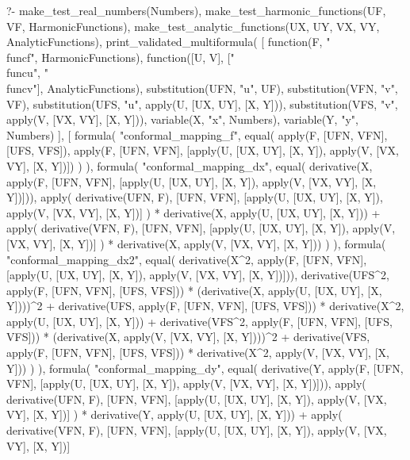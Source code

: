 \begin{prolog}
?-	make_test_real_numbers(Numbers),
	make_test_harmonic_functions(UF, VF, HarmonicFunctions),
	make_test_analytic_functions(UX, UY, VX, VY, AnalyticFunctions),
	print_validated_multiformula(
		[
			function(F, "\\func{f}", HarmonicFunctions),
			function([U, V], ["\\func{u}", "\\func{v}"], AnalyticFunctions),
			substitution(UFN, "u", UF),   %
			substitution(VFN, "v", VF),   %
			substitution(UFS, "u", apply(U, [UX, UY], [X, Y])),   %
			substitution(VFS, "v", apply(V, [VX, VY], [X, Y])),   %
			variable(X, "x", Numbers),
			variable(Y, "y", Numbers)
		],
		[
			formula(
				"conformal_mapping_f",
				equal(
					apply(F, [UFN, VFN], [UFS, VFS]),
					apply(F, [UFN, VFN], [apply(U, [UX, UY], [X, Y]), apply(V, [VX, VY], [X, Y])])
				)
			),
			formula(
				"conformal_mapping_dx",
				equal(
					derivative(X, apply(F, [UFN, VFN], [apply(U, [UX, UY], [X, Y]), apply(V, [VX, VY], [X, Y])])),
					apply(
						derivative(UFN, F),
						[UFN, VFN], [apply(U, [UX, UY], [X, Y]), apply(V, [VX, VY], [X, Y])]
					) * derivative(X, apply(U, [UX, UY], [X, Y])) +
					apply(
						derivative(VFN, F),
						[UFN, VFN], [apply(U, [UX, UY], [X, Y]), apply(V, [VX, VY], [X, Y])]
					) * derivative(X, apply(V, [VX, VY], [X, Y]))
				)
			),
			formula(
				"conformal_mapping_dx2",
				equal(
					derivative(X^2, apply(F, [UFN, VFN], [apply(U, [UX, UY], [X, Y]), apply(V, [VX, VY], [X, Y])])),
					derivative(UFS^2, apply(F, [UFN, VFN], [UFS, VFS])) * (derivative(X, apply(U, [UX, UY], [X, Y])))^2 +
					derivative(UFS, apply(F, [UFN, VFN], [UFS, VFS])) * derivative(X^2, apply(U, [UX, UY], [X, Y])) +
					derivative(VFS^2, apply(F, [UFN, VFN], [UFS, VFS])) * (derivative(X, apply(V, [VX, VY], [X, Y])))^2 +
					derivative(VFS, apply(F, [UFN, VFN], [UFS, VFS])) * derivative(X^2, apply(V, [VX, VY], [X, Y]))
				)
			),
			formula(
				"conformal_mapping_dy",
				equal(
					derivative(Y, apply(F, [UFN, VFN], [apply(U, [UX, UY], [X, Y]), apply(V, [VX, VY], [X, Y])])),
					apply(
						derivative(UFN, F),
						[UFN, VFN], [apply(U, [UX, UY], [X, Y]), apply(V, [VX, VY], [X, Y])]
					) * derivative(Y, apply(U, [UX, UY], [X, Y])) +
					apply(
						derivative(VFN, F),
						[UFN, VFN], [apply(U, [UX, UY], [X, Y]), apply(V, [VX, VY], [X, Y])]

\end{prolog}
